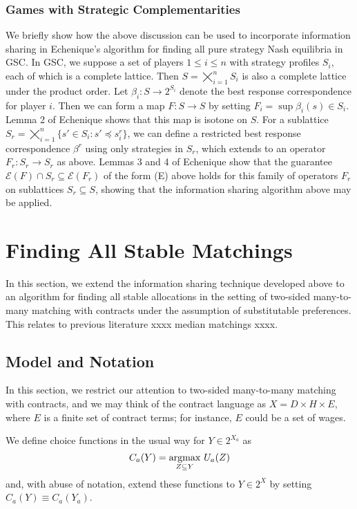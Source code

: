 \documentclass[11pt,reqno]{amsart}
\theoremstyle{definition}
\numberwithin{equation}{section}
\newcommand{\argmax}{\operatornamewithlimits{argmax}}
\newcommand{\sub}{\subseteq}
\newcommand{\fix}{\mathcal{E}}
\newcommand{\peq}{\preceq}
\newcommand{\oper}{F}
\begin{document}
\subsubsection{Games with Strategic Complementarities}
We briefly show how the above discussion can be used to incorporate information sharing in Echenique's algorithm for finding all pure strategy Nash equilibria in GSC. 
In GSC, we suppose a set of players $1 \leq i \leq n$ with strategy profiles $S_i$, each of which is a complete lattice.
Then $S = \bigtimes_{i = 1}^n S_i$ is also a complete lattice under the product order.
Let $\beta_i: S \to 2^{S_i}$ denote the best response correspondence for player $i$.
Then we can form a map $\oper: S \to S$ by setting $\oper_i = \sup \beta_i(s) \in S_i$.
Lemma 2 of Echenique shows that this map is isotone on $S$.
For a sublattice $S_r = \bigtimes_{i = 1}^n \{s' \in S_i: s' \peq s^r_i\}$, we can define a restricted best response correspondence $\beta^r$ using only strategies in $S_r$, which extends to an operator $\oper_r: S_r \to S_r$ as above.
Lemmas 3 and 4 of Echenique show that the guarantee $\fix(\oper) \cap S_r \sub \fix (F_r)$ of the form (E) above holds for this family of operators $\oper_r$ on sublattices $S_r \sub S$, showing that the information sharing algorithm above may be applied.

\section{Finding All Stable Matchings} 
In this section, we extend the information sharing technique developed above to an algorithm for finding all stable allocations in the setting of two-sided many-to-many matching with contracts under the assumption of substitutable preferences.
This relates to previous literature xxxx median matchings xxxx.

\subsection{Model and Notation} 
In this section, we restrict our attention to two-sided many-to-many matching with contracts, and we may think of the contract language as $X = D\times H \times E$, where $E$ is a finite set of contract terms; for instance, $E$ could be a set of wages.

We define choice functions in the usual way for $Y\in 2^{X_a}$ as 
\[
C_a(Y) = \argmax_{Z\subseteq Y} \, U_a(Z)
\]
and, with abuse of notation, extend these functions to $Y\in 2^X$ by setting $C_a(Y) \equiv C_a(Y_a)$.
\end{document}
